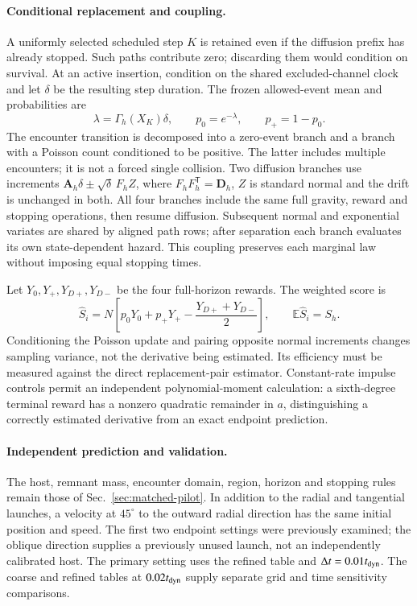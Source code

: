 \documentclass[aps,prd,reprint,amsmath,amssymb,superscriptaddress,nofootinbib,longbibliography,floatfix]{revtex4-2}
\begin{document}
\paragraph{Conditional replacement and coupling.}
A uniformly selected scheduled step $K$ is retained even if the diffusion prefix has already stopped. Such paths contribute zero; discarding them would condition on survival. At an active insertion, condition on the shared excluded-channel clock and let $\delta$ be the resulting step duration. The frozen allowed-event mean and probabilities are
\begin{equation}
\lambda=\Gamma_h(X_K)\delta,\qquad
p_0=e^{-\lambda},\qquad p_+=1-p_0.
\label{eq:response-poisson-weights}
\end{equation}
The encounter transition is decomposed into a zero-event branch and a branch with a Poisson count conditioned to be positive. The latter includes multiple encounters; it is not a forced single collision. Two diffusion branches use increments $\mathbf A_h\delta\pm\sqrt{\delta}\,F_h Z$, where $F_hF_h^{\mathsf T}=\mathbf D_h$, $Z$ is standard normal and the drift is unchanged in both. All four branches include the same full gravity, reward and stopping operations, then resume diffusion. Subsequent normal and exponential variates are shared by aligned path rows; after separation each branch evaluates its own state-dependent hazard. This coupling preserves each marginal law without imposing equal stopping times.

Let $Y_0,Y_+,Y_{D+},Y_{D-}$ be the four full-horizon rewards. The weighted score is
\begin{equation}
\widehat S_i=N\left[p_0Y_0+p_+Y_+
-\frac{Y_{D+}+Y_{D-}}{2}\right],
\qquad \mathbb E\widehat S_i=S_h.
\label{eq:weighted-response-score}
\end{equation}
Conditioning the Poisson update and pairing opposite normal increments changes sampling variance, not the derivative being estimated. Its efficiency must be measured against the direct replacement-pair estimator. Constant-rate impulse controls permit an independent polynomial-moment calculation: a sixth-degree terminal reward has a nonzero quadratic remainder in $a$, distinguishing a correctly estimated derivative from an exact endpoint prediction.

\paragraph{Independent prediction and validation.}
The host, remnant mass, encounter domain, region, horizon and stopping rules remain those of Sec.~\ref{sec:matched-pilot}. In addition to the radial and tangential launches, a velocity at $45^\circ$ to the outward radial direction has the same initial position and speed. The first two endpoint settings were previously examined; the oblique direction supplies a previously unused launch, not an independently calibrated host. The primary setting uses the refined table and $\Delta t=0.01t_{\rm dyn}$. The coarse and refined tables at $0.02t_{\rm dyn}$ supply separate grid and time sensitivity comparisons.
\end{document}
